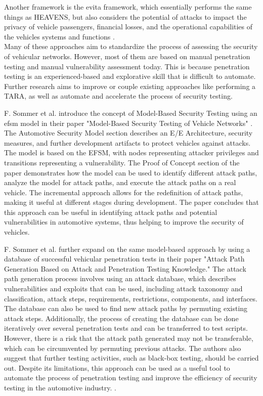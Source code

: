 Another framework is the \gls{evita} framework, which essentially performs the same things as HEAVENS, 
but also considers the potential of attacks to impact the privacy of vehicle passengers, financial losses, 
and the operational capabilities of the vehicles systems and functions \cite{evita}.\\


Many of these approaches aim to standardize the process of assessing the security of vehicular networks. However, most of them are based on manual penetration testing and manual vulnerability assessment today. 
This is because penetration testing is an experienced-based and explorative skill that is difficult to automate. 
Further research aims to improve or couple existing approaches like performing a TARA, as well as automate and accelerate the process of security testing.

F. Sommer et al. introduce the concept of Model-Based Security Testing using an \gls{efsm} model in their paper "Model-Based Security Testing of Vehicle Networks" \cite{model_based_testing}.
The Automotive Security Model section describes an E/E Architecture, security measures, and further development artifacts to protect vehicles against attacks.
The model is based on the EFSM, with nodes representing attacker privileges and transitions representing a vulnerability.
The Proof of Concept section of the paper demonstrates how the model can be used to identify different \gls{attack path}s, analyze the model for attack paths, and execute the attack paths on a real vehicle. 
The incremental approach allows for the redefinition of attack paths, making it useful at different stages during development. 
The paper concludes that this approach can be useful in identifying attack paths and potential vulnerabilities in automotive systems, thus helping to improve the security of vehicles.

F. Sommer et al. further expand on the same model-based approach by using a database of successful vehicular penetration tests in their paper "Attack Path Generation Based on Attack and Penetration Testing Knowledge." 
The attack path generation process involves using an attack database, which describes vulnerabilities and exploits that can be used, including attack taxonomy and classification, attack steps, requirements, restrictions, components, and interfaces. 
The database can also be used to find new attack paths by permuting existing attack steps. 
Additionally, the process of creating the database can be done iteratively over several penetration tests and can be transferred to test scripts. 
However, there is a risk that the attack path generated may not be transferable, which can be circumvented by permuting previous attacks. 
The authors also suggest that further testing activities, such as black-box testing, should be carried out. 
Despite its limitations, this approach can be used as a useful tool to automate the process of penetration testing and improve the efficiency of security testing in the automotive industry. \cite{attack_database}.

